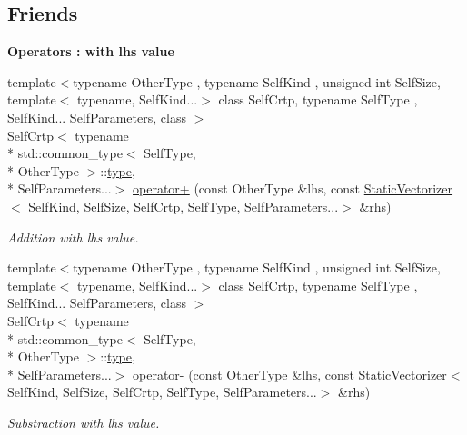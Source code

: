 \subsection*{Friends}
\begin{Indent}{\bf Operators \-: with lhs value}\par
\begin{DoxyCompactItemize}
\item 
{\footnotesize template$<$typename Other\-Type , typename Self\-Kind , unsigned int Self\-Size, template$<$ typename, Self\-Kind...$>$ class Self\-Crtp, typename Self\-Type , Self\-Kind... Self\-Parameters, class $>$ }\\Self\-Crtp$<$ typename \\*
std\-::common\-\_\-type$<$ Self\-Type, \\*
Other\-Type $>$\-::\hyperlink{classmagrathea_1_1StaticVectorizer_a28c393a3896a3e839008c35d56b10a54}{type}, \\*
Self\-Parameters...$>$ \hyperlink{classmagrathea_1_1StaticVectorizer_a8b6774aab42c9363c5820c74ccc0a02e}{operator+} (const Other\-Type \&lhs, const \hyperlink{classmagrathea_1_1StaticVectorizer}{Static\-Vectorizer}$<$ Self\-Kind, Self\-Size, Self\-Crtp, Self\-Type, Self\-Parameters...$>$ \&rhs)
\begin{DoxyCompactList}\small\item\em Addition with lhs value. \end{DoxyCompactList}\item 
{\footnotesize template$<$typename Other\-Type , typename Self\-Kind , unsigned int Self\-Size, template$<$ typename, Self\-Kind...$>$ class Self\-Crtp, typename Self\-Type , Self\-Kind... Self\-Parameters, class $>$ }\\Self\-Crtp$<$ typename \\*
std\-::common\-\_\-type$<$ Self\-Type, \\*
Other\-Type $>$\-::\hyperlink{classmagrathea_1_1StaticVectorizer_a28c393a3896a3e839008c35d56b10a54}{type}, \\*
Self\-Parameters...$>$ \hyperlink{classmagrathea_1_1StaticVectorizer_a7ca40e03311c4e8c24e77ce2532b68d7}{operator-\/} (const Other\-Type \&lhs, const \hyperlink{classmagrathea_1_1StaticVectorizer}{Static\-Vectorizer}$<$ Self\-Kind, Self\-Size, Self\-Crtp, Self\-Type, Self\-Parameters...$>$ \&rhs)
\begin{DoxyCompactList}\small\item\em Substraction with lhs value. \end{DoxyCompactList}\item 

\end{DoxyCompactItemize}
\end{Indent}
